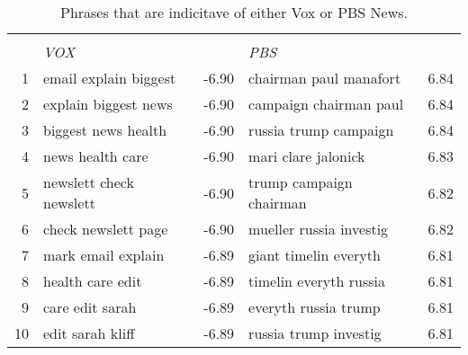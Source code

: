 \begin{table}[ht]
\caption{Phrases that are indicitave of either Vox or PBS News.}
\label{tab:vox_pbs}
\centering
\begin{tabular}{rlr|lr}
  \hline
  &             &        &          &        \\
 & \textit{VOX} &  & \textit{PBS} &  \\ 
  \hline
1 & email explain biggest & -6.90 & chairman paul manafort & 6.84 \\ 
  2 & explain biggest news & -6.90 & campaign chairman paul & 6.84 \\ 
  3 & biggest news health & -6.90 & russia trump campaign & 6.84 \\ 
  4 & news health care & -6.90 & mari clare jalonick & 6.83 \\ 
  5 & newslett check newslett & -6.90 & trump campaign chairman & 6.82 \\ 
  6 & check newslett page & -6.90 & mueller russia investig & 6.82 \\ 
  7 & mark email explain & -6.89 & giant timelin everyth & 6.81 \\ 
  8 & health care edit & -6.89 & timelin everyth russia & 6.81 \\ 
  9 & care edit sarah & -6.89 & everyth russia trump & 6.81 \\ 
  10 & edit sarah kliff & -6.89 & russia trump investig & 6.81 \\ 
   \hline
\end{tabular}
\end{table}
